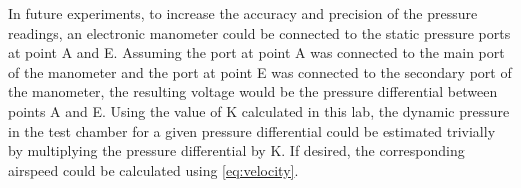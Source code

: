 In future experiments, to increase the accuracy and precision of the pressure readings, an electronic manometer could be connected to the static pressure ports at point A and E. Assuming the port at point A was connected to the main port of the manometer and the port at point E was connected to the secondary port of the manometer, the resulting voltage would be the pressure differential between points A and E. Using the value of \gls{K} calculated in this lab, the dynamic pressure in the test chamber for a given pressure differential could be estimated trivially by multiplying the pressure differential by \gls{K}. If desired, the corresponding airspeed could be calculated using \autoref{eq:velocity}.
